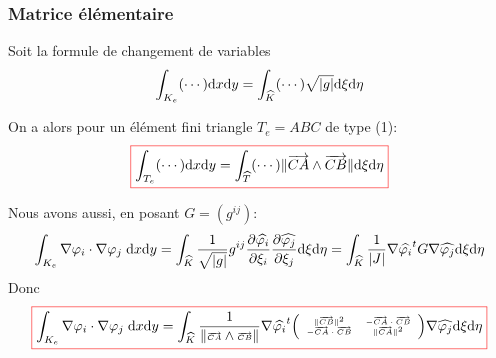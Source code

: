 \documentclass{beamer}
\def \de {{\rm d}}
\newcommand{\myredbox}[1]{\fcolorbox{red}{white}{$\displaystyle#1$}}
\begin{document}
\begin{frame}
\frametitle{Matrice élémentaire}

Soit la formule de changement de variables
\[\int_{K_e}(\cdots) \de x\de y=\int_{\widehat{K}}(\cdots) \sqrt{|g|} \de \xi\de \eta\]

On a alors pour un élément fini triangle $T_e=ABC$ de type (1):
\[\myredbox{\int_{T_e}(\cdots) \de x\de y=\int_{\widehat{T}}(\cdots) \|\overrightarrow{CA}\wedge \overrightarrow{CB} \| \de \xi\de \eta}\]

Nous avons aussi, en posant $G=(g^{ij})$:
\[\displaystyle \int_{K_e}\nabla \varphi_i\cdot \nabla \varphi_j\;\de x\de y=\int_{\widehat{K}}\frac{1}{\sqrt{|g|} } g^{ij}\frac{\partial \widehat{\varphi_i}}{\partial \xi_i}\frac{\partial \widehat{\varphi_j}}{\partial \xi_j}\de \xi\de \eta=\int_{\widehat{K}}\frac{1}{|J|} \nabla \widehat{\varphi_i}^t G  \nabla \widehat{\varphi_j}\de \xi\de \eta\]
Donc
\[\myredbox{\displaystyle \int_{K_e}\nabla \varphi_i\cdot \nabla \varphi_j\;\de x\de y=\int_{\widehat{K}}
{\tiny
\frac{1}{\|\overrightarrow{CA}\wedge \overrightarrow{CB} \|} 
}
\nabla \widehat{\varphi_i}^t 
{\tiny
\left(\begin{array}{cc}
\|\overrightarrow{CB}\|^2   &-\overrightarrow{CA}\cdot \overrightarrow{CB} \\
-\overrightarrow{CA}\cdot \overrightarrow{CB} & \|\overrightarrow{CA}\|^2
\end{array}\right) 
}
\nabla \widehat{\varphi_j}\de \xi\de \eta}\]

\end{frame}
\end{document}
